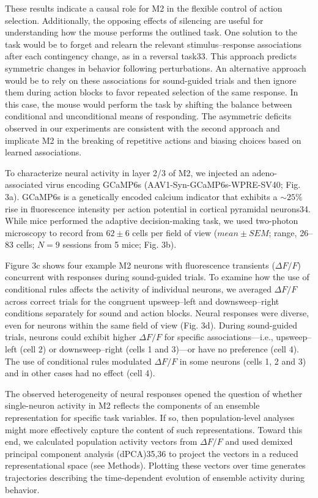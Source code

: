 These results indicate a causal role for M2 in the flexible control of action selection. Additionally, the opposing effects of silencing are useful for understanding how the mouse performs the outlined task. One solution to the task would be to forget and relearn the relevant stimulus–response associations after each contingency change, as in a reversal task33. This approach predicts symmetric changes in behavior following perturbations. An alternative approach would be to rely on these associations for sound-guided trials and then ignore them during action blocks to favor repeated selection of the same response. In this case, the mouse would perform the task by shifting the balance between conditional and unconditional means of responding. The asymmetric deficits observed in our experiments are consistent with the second approach and implicate M2 in the breaking of repetitive actions and biasing choices based on learned associations.

To characterize neural activity in layer 2/3 of M2, we injected an adeno-associated virus encoding GCaMP6s (AAV1-Syn-GCaMP6s-WPRE-SV40; Fig. 3a). GCaMP6s is a genetically encoded calcium indicator that exhibits a $\sim 25\%$ rise in fluorescence intensity per action potential in cortical pyramidal neurons34. While mice performed the adaptive decision-making task, we used two-photon microscopy to record from $62 \pm 6$ cells per field of view ($mean \pm SEM$; range, 26–83 cells; $N = 9$ sessions from 5 mice; Fig. 3b). 


Figure 3c shows four example M2 neurons with fluorescence transients ($\Delta F/F$) concurrent with responses during sound-guided trials. To examine how the use of conditional rules affects the activity of individual neurons, we averaged $\Delta F/F$ across correct trials for the congruent upsweep–left and downsweep–right conditions separately for sound and action blocks. Neural responses were diverse, even for neurons within the same field of view (Fig. 3d). During sound-guided trials, neurons could exhibit higher $\Delta F/F$ for specific associations---i.e., upsweep–left (cell 2) or downsweep–right (cells 1 and 3)---or have no preference (cell 4). The use of conditional rules modulated $\Delta F/F$ in some neurons (cells 1, 2 and 3) and in other cases had no effect (cell 4).

The observed heterogeneity of neural responses opened the question of whether single-neuron activity in M2 reflects the components of an ensemble representation for specific task variables. If so, then population-level analyses might more effectively capture the content of such representations. Toward this end, we calculated population activity vectors from $\Delta F/F$ and used demixed principal component analysis (dPCA)35,36 to project the vectors in a reduced representational space (see Methods). Plotting these vectors over time generates trajectories describing the time-dependent evolution of ensemble activity during behavior. 

